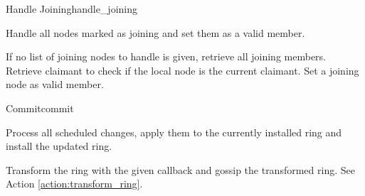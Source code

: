 \begin{actionbox}{Handle Joining}{handle_joining}
	\begin{action}
		 Handle all nodes marked as joining and set them as a valid member.
		\begin{action}
			 If no list of joining nodes to handle is given, retrieve all joining members.
			 Retrieve claimant to check if the local node is the current claimant.
			 Set a joining node as valid member.
		\end{action}
	\end{action}
\end{actionbox}

\begin{actionbox}{Commit}{commit}
	\begin{action}
		 Process all scheduled changes, apply them to the currently installed ring and install the updated ring.
		\begin{action}
			 Transform the ring with the given callback and gossip the transformed ring. See Action \ref{action:transform_ring}.
		\end{action}
	\end{action}
\end{actionbox}

